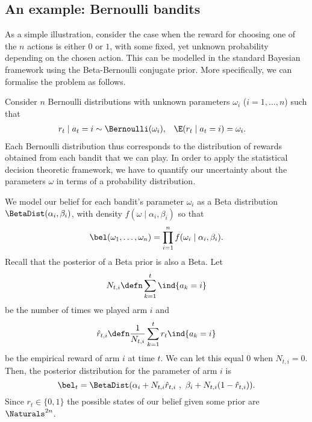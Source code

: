 \subsection{An example: Bernoulli bandits}
\label{sec:bernoulli-bandit-example}
As a simple illustration, consider the case when the reward for choosing one of the $n$ actions is either $0$ or $1$, with some fixed, yet unknown probability depending on the chosen action. This can be modelled in the standard Bayesian framework using the Beta-Bernoulli conjugate prior. More specifically, we can formalise the problem as follows.

Consider $n$ Bernoulli distributions with
unknown parameters $\omega_i$ ($i = 1, \ldots, n$) such that 
\begin{align}
  r_t \mid a_t = i &\sim
                     \Bernoulli(\omega_i),
  &
    \E(r_t  \mid a_t = i) &= \omega_i.
\end{align}
Each Bernoulli distribution thus corresponds to the distribution of
rewards obtained from each bandit that we can play.  In order to
apply the statistical decision theoretic framework, we have to
quantify our uncertainty about the parameters $\omega$ in terms of a
probability distribution.

We model our belief for each bandit's
parameter $\omega_i$ as a Beta distribution $\BetaDist(\alpha_i,
\beta_i)$, with density $f(\omega \mid \alpha_i, \beta_i)$ so that
\[
\bel(\omega_1, \ldots, \omega_n)
=
\prod_{i=1}^n f(\omega_i \mid \alpha_i, \beta_i).
\]
Recall that the posterior of a Beta prior is also a Beta. Let
\[
N_{t,i} \defn \sum_{k=1}^t \ind{a_k = i}
\]
be the number of times we played arm $i$ and
\[
\hat{r}_{t,i} \defn \frac{1}{N_{t,i}} \sum_{k=1}^t r_t \ind{a_k = i}
\]
be the
\alert{empirical reward} of arm $i$ at time $t$. We
can let this equal $0$ when $N_{t,i} = 0$.
Then, the posterior distribution for the parameter of arm $i$ is
\[
\bel_t = \BetaDist(\alpha_i + N_{t,i} \hat{r}_{t,i}~,~ \beta_i + N_{t,i} (1 - \hat{r}_{t,i})).
\]
Since $r_t \in \{0,1\}$ the possible states of our belief given some
prior are $\Naturals^{2n}$.

